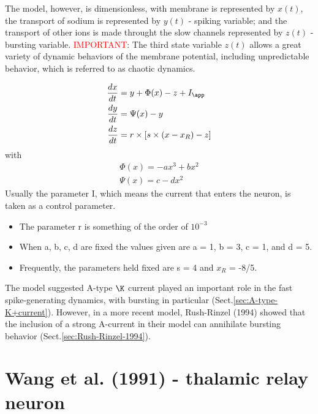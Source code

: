 The model, however, is dimensionless, with membrane is represented by $x(t)$,
the transport of sodium is represented by $y(t)$ - spiking variable; and the
transport of other ions is made throught the slow channels represented by
$z(t)$ - bursting variable. \textcolor{red}{IMPORTANT}: The third state variable
$z(t)$  allows a great variety of dynamic behaviors of the membrane potential,
including unpredictable behavior, which is referred to as chaotic dynamics.

\begin{equation}
\begin{split}
\frac{dx}{dt} &= y + \Phi(x) - z + I_\app \\
\frac{dy}{dt} &= \Psi(x) - y \\
\frac{dz}{dt} &= r \times [ s \times (x - x_R) - z]
\end{split}
\end{equation}
with
\begin{equation}
\begin{split}
\Phi(x) = -a x^3 + b x^2 \\
\Psi(x) = c - d x^2
\end{split}
\end{equation}
Usually the parameter I, which means the current that enters the neuron, is
taken as a control parameter. 
\begin{itemize}
  \item The parameter r is something of the order of $10^{-3}$
  \item When a, b, c, d are fixed the values given are a = 1, b = 3, c
= 1, and d = 5. 

  \item Frequently, the parameters held fixed are s = 4 and $x_R$ = -8/5. 
\end{itemize}


The model suggested A-type $\K$ current played an important role in the fast
spike-generating dynamics, with bursting in particular
(Sect.\ref{sec:A-type-K+current}).
However, in a more recent model, Rush-Rinzel (1994) showed that
the inclusion of a strong A-current in their model can annihilate bursting
behavior (Sect.\ref{sec:Rush-Rinzel-1994}). 



\section{Wang et al. (1991) - thalamic relay neuron}
\label{sec:Wang-1991-thalamic-relay-neuron}

